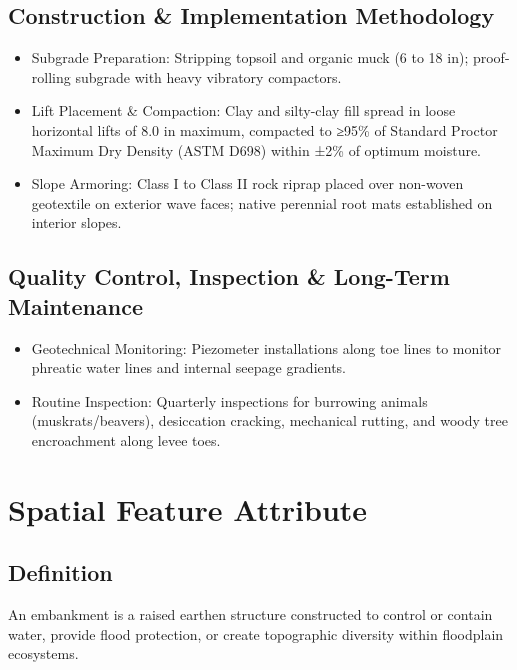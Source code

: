 \documentclass[
  letterpaper,
  DIV=11,
  numbers=noendperiod]{scrreprt}
\begin{document}
\subsection{Construction \& Implementation
Methodology}\label{construction-implementation-methodology-1}

\begin{itemize}
\item
  Subgrade Preparation: Stripping topsoil and organic muck (6 to 18 in);
  proof-rolling subgrade with heavy vibratory compactors.
\item
  Lift Placement \& Compaction: Clay and silty-clay fill spread in loose
  horizontal lifts of 8.0 in maximum, compacted to ≥95\% of Standard
  Proctor Maximum Dry Density (ASTM D698) within ±2\% of optimum
  moisture.
\item
  Slope Armoring: Class I to Class II rock riprap placed over non-woven
  geotextile on exterior wave faces; native perennial root mats
  established on interior slopes.
\end{itemize}

\subsection{Quality Control, Inspection \& Long-Term
Maintenance}\label{quality-control-inspection-long-term-maintenance-1}

\begin{itemize}
\item
  Geotechnical Monitoring: Piezometer installations along toe lines to
  monitor phreatic water lines and internal seepage gradients.
\item
  Routine Inspection: Quarterly inspections for burrowing animals
  (muskrats/beavers), desiccation cracking, mechanical rutting, and
  woody tree encroachment along levee toes.
\end{itemize}

\section{Spatial Feature Attribute}\label{spatial-feature-attribute-1}

\subsection{Definition}\label{definition-1}

An embankment is a raised earthen structure constructed to control or
contain water, provide flood protection, or create topographic diversity
within floodplain ecosystems.
\end{document}
